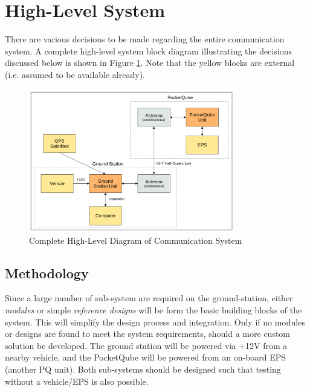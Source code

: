 \graphicspath{{./figures}}

\section{High-Level System}
There are various decisions to be made regarding the entire communication system. A complete high-level system block diagram illustrating the decisions discussed below is shown in Figure \ref{fig:complete_system}. Note that the yellow blocks are external (i.e. assumed to be available already).

\begin{figure}[!htb]
    \centering
    \includegraphics[width=0.8\textwidth]{complete_system.png}
    \caption{Complete High-Level Diagram of Communication System}
    \label{fig:complete_system}
  \end{figure}

\newpage
\subsection{Methodology}
Since a large number of sub-system are required on the ground-station, either \textit{modules} or simple \textit{reference designs} will be form the basic building blocks of the system. This will simplify the design process and integration. Only if no modules or designs are found to meet the system requirements, should a more custom solution be developed. The ground station will be powered via +12V from a nearby vehicle, and the PocketQube will be powered from an on-board EPS (another PQ unit). Both sub-systems should be designed such that testing without a vehicle/EPS is also possible.


